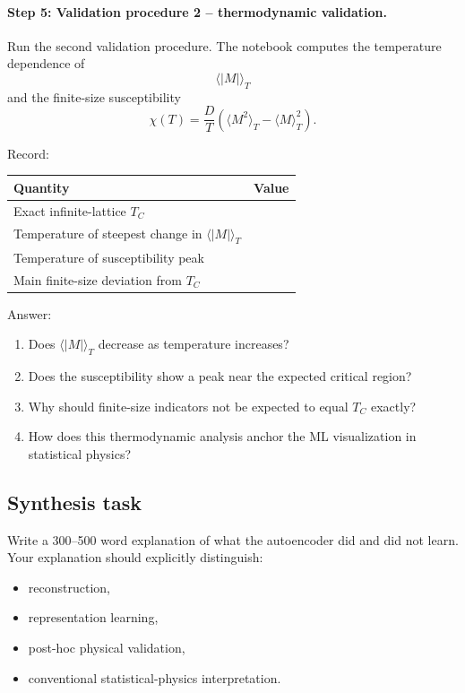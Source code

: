 \documentclass[11pt]{article}
\begin{document}
\paragraph{Step 5: Validation procedure 2 -- thermodynamic validation.}
Run the second validation procedure. The notebook computes the temperature dependence of
\[
\langle |M| \rangle_T
\]
and the finite-size susceptibility
\[
\chi(T)=\frac{D}{T}\left(\langle M^2\rangle_T-\langle M\rangle_T^2\right).
\]

Record:
\begin{center}
\begin{tabular}{l l}
\hline
Quantity & Value \\
\hline
Exact infinite-lattice \(T_C\) & \\
Temperature of steepest change in \(\langle |M| \rangle_T\) & \\
Temperature of susceptibility peak & \\
Main finite-size deviation from \(T_C\) & \\
\hline
\end{tabular}
\end{center}

Answer:
\begin{enumerate}
    \item Does \(\langle |M| \rangle_T\) decrease as temperature increases?
    \item Does the susceptibility show a peak near the expected critical region?
    \item Why should finite-size indicators not be expected to equal \(T_C\) exactly?
    \item How does this thermodynamic analysis anchor the ML visualization in statistical physics?
\end{enumerate}

\subsection*{Synthesis task}
Write a 300--500 word explanation of what the autoencoder did and did not learn. Your explanation should explicitly distinguish:
\begin{itemize}
    \item reconstruction,
    \item representation learning,
    \item post-hoc physical validation,
    \item conventional statistical-physics interpretation.
\end{itemize}
\end{document}
